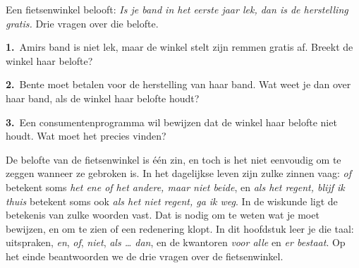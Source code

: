 %


\begin{probleem}
Een fietsenwinkel belooft: \textit{Is je band in het eerste jaar lek, dan is de herstelling gratis.} Drie vragen over die belofte.

\vspace{1mm}
\textbf{1.}~Amirs band is niet lek, maar de winkel stelt zijn remmen gratis af. Breekt de winkel haar belofte?

\textbf{2.}~Bente moet betalen voor de herstelling van haar band. Wat weet je dan over haar band, als de winkel haar belofte houdt?

\textbf{3.}~Een consumentenprogramma wil bewijzen dat de winkel haar belofte niet houdt. Wat moet het precies vinden?
\end{probleem}


De belofte van de fietsenwinkel is één zin, en toch is het niet eenvoudig om te zeggen wanneer ze gebroken is. In het dagelijkse leven zijn zulke zinnen vaag: \textit{of} betekent soms \textit{het ene of het andere, maar niet beide}, en \textit{als het regent, blijf ik thuis} betekent soms ook \textit{als het niet regent, ga ik weg}. In de wiskunde ligt de betekenis van zulke woorden vast. Dat is nodig om te weten wat je moet bewijzen, en om te zien of een redenering klopt. In dit hoofdstuk leer je die taal: uitspraken, \textit{en}, \textit{of}, \textit{niet}, \textit{als \ldots{} dan}, en de kwantoren \textit{voor alle} en \textit{er bestaat}. Op het einde beantwoorden we de drie vragen over de fietsenwinkel.

